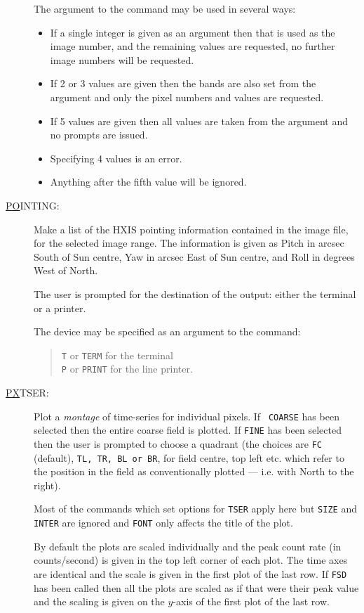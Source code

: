 \begin{description}
The argument to the command may be used in several ways:
\begin{itemize}
\item If a single integer is given as an argument then that is used as the image
number, and the remaining values are requested, no further image
numbers will be requested.
\item If 2 or 3 values are given then the bands are also set from the argument
and only the pixel numbers and values are requested.
\item If 5 values are given then all values are taken from the argument and no
prompts are issued.
\item Specifying 4 values is an error.
\item Anything after the fifth value will be ignored.
\end{itemize}

\item[\underline{PO}INTING: ] \label{po}
Make a list of the HXIS pointing information contained in the image
file, for the selected image range. The information is given as Pitch
in arcsec South of Sun centre, Yaw in arcsec East of Sun centre, and
Roll in degrees West of North.

The user is prompted for the destination of the output: either the
terminal or a printer.

The device may be specified as an argument to the command:
\begin{quote}
{\tt T} or {\tt TERM} for the terminal\\ {\tt P} or {\tt PRINT} for the
line printer.
\end{quote}

\item[\underline{PX}TSER: ] \label{px}
Plot a {\em montage} of time-series for individual pixels. If {\tt
COARSE} has been selected then the entire coarse field is plotted. If
{\tt FINE} has been selected then the user is prompted to choose a
quadrant (the choices are {\tt FC} (default), {\tt TL, TR, BL {\rm or}
BR}, for field centre, top left etc. which refer to the position in the
field as conventionally plotted --- i.e. with North to the right).

Most of the commands which set options for {\tt TSER} apply here but
{\tt SIZE} and {\tt INTER} are ignored and {\tt FONT} only affects the
title of the plot.

By default the plots are scaled individually and the peak count rate
(in counts/second) is given in the top left corner of each plot. The
time axes are identical and the scale is given in the first plot of the
last row. If {\tt FSD} has been called then all the plots are scaled as
if that were their peak value and the scaling is given on the $y$-axis
of the first plot of the last row.


\end{description}

